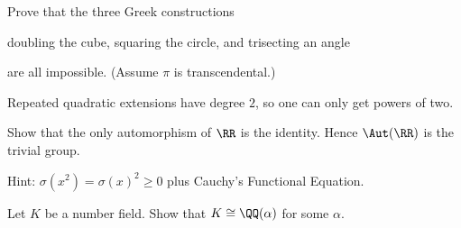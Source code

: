 \begin{problem}
	Prove that the three Greek constructions
	\begin{enumerate}[(a)]
		\ii doubling the cube,
		\ii squaring the circle, and
		\ii trisecting an angle
	\end{enumerate}
	are all impossible.
	(Assume $\pi$ is transcendental.)
	\begin{hint}
		Repeated quadratic extensions have degree $2$, so one can
		only get powers of two.
	\end{hint}
\end{problem}

\begin{problem}
	Show that the only automorphism of $\RR$ is the identity.
	Hence $\Aut(\RR)$ is the trivial group.
	\begin{hint}
		Hint: $\sigma(x^2) = \sigma(x)^2 \ge 0$ plus Cauchy's Functional Equation.
	\end{hint}
\end{problem}

\begin{problem}
	\yod
	Let $K$ be a number field.
	Show that $K \cong \QQ(\alpha)$ for some $\alpha$.
	\label{prob:artin_primitive_elm}
\end{problem}
